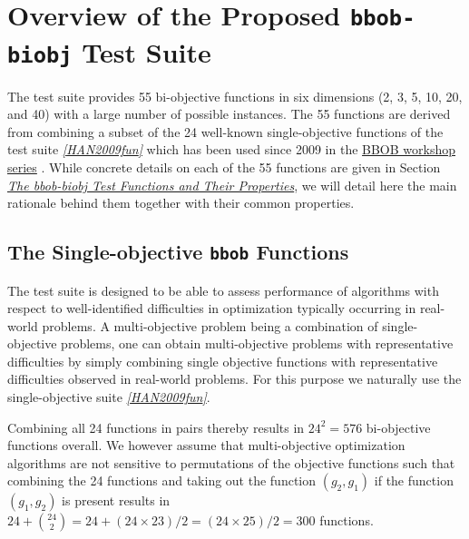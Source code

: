 \documentclass[letterpaper,12pt,english]{article}
\begin{document}
\section{Overview of the Proposed \texttt{bbob-biobj} Test Suite}
\label{index:overview-of-the-proposed-bbob-biobj-test-suite}
The  test suite provides 55 bi-objective functions in six
dimensions (2, 3, 5, 10, 20, and 40) with a large number of possible instances.
The 55 functions are derived from combining a subset of the 24 well-known
single-objective functions of the  test suite \label{index:id3}{\hyperref[index:han2009fun]{\emph{{[}HAN2009fun{]}}}} which
has been used since 2009 in the \href{http://numbbo.github.io/workshops/}{BBOB workshop series} . While concrete details on each of
the 55  functions are given in Section
{\hyperref[index:sec\string-test\string-functions]{\emph{The bbob-biobj Test Functions and Their Properties}}}, we will detail here the main rationale behind
them together with their common properties.


\subsection{The Single-objective \texttt{bbob} Functions}
\label{index:the-single-objective-bbob-functions}
The  test suite is designed to be able to assess  performance of algorithms with respect to well-identified difficulties in optimization typically  occurring in real-world problems. A multi-objective problem being a combination of single-objective problems, one can obtain multi-objective problems with representative difficulties by simply combining single objective functions with representative difficulties observed in real-world problems. For this purpose we naturally use the single-objective  suite \label{index:id4}{\hyperref[index:han2009fun]{\emph{{[}HAN2009fun{]}}}}.

Combining all 24  functions in pairs thereby results in
\(24^2=576\) bi-objective functions overall. We however assume that
multi-objective optimization algorithms are not sensitive to permutations of
the objective functions such that combining the 24   functions and
taking out the function \((g_2,g_1)\) if the function \((g_1,g_2)\)
is present results in \(24 + {24 \choose 2} = 24 + (24\times23)/2 = (24\times25)/2 = 300\) functions.
\end{document}
